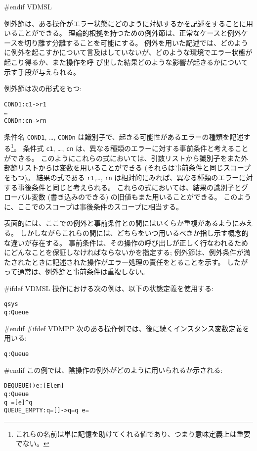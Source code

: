 \documentclass[\pformat,12pt]{jarticle}
\begin{document}
\begin{description}
#endif VDMSL

例外節は、ある操作がエラー状態にどのように対処するかを記述をすることに用いることができる。
理論的根拠を持つための例外節は、正常なケースと例外ケースを切り離す分離することを可能にする。
例外を用いた記述では、どのように例外を起こすかについて言及はしていないが、どのような環境でエラー状態が起こり得るか、また操作を呼
び出した結果どのような影響が起きるかについて示す手段が与えられる。

例外節は次の形式をもつ:
\begin{alltt}
    COND1: c1 -> r1
       \ldots
       CONDn: cn -> rn
\end{alltt}
条件名 {\tt COND1}, \ldots, {\tt CONDn} は識別子で、起きる可能性があるエラーの種類を記述する\footnote{これらの名前は単に記憶を助けてくれる値であり、つまり意味定義上は重要でない。}。 
条件式 {\tt c1}, \ldots, {\tt cn} は、異なる種類のエラーに対する事前条件と考えることができる。
このようにこれらの式においては、引数リストから識別子をまた外部節リストからは変数を用いることができる (それらは事前条件と同じスコープをもつ)。
結果の式である {\tt r1},\ldots, {\tt rn} は相対的にみれば、異なる種類のエラーに対する事後条件と同じと考えられる。
これらの式においては、結果の識別子とグローバル変数 (書き込みのできる) の旧値もまた用いることができる。
このように、ここでのスコープは事後条件のスコープに相当する。

表面的には、ここでの例外と事前条件との間にはいくらか重複があるようにみえる。
しかしながらこれらの間には、どちらをいつ用いるべきか指し示す概念的な違いが存在する。 
事前条件は、その操作の呼び出しが正しく行なわれるためにどんなことを保証しなければならないかを指定する; 例外節は、例外条件が満たされたときに記述された操作がエラー処理の責任をとることを示す。
したがって通常は、例外節と事前条件は重複しない。

#ifdef VDMSL
操作における次の例は、以下の状態定義を使用する:
\begin{alltt}
   qsys 
    q : Queue
\end{alltt}    
#endif
#ifdef VDMPP
次のある操作例では、後に続くインスタンス変数定義を用いる:
\begin{alltt}
    q : Queue
\end{alltt}    
#endif
この例では、陰操作の例外がどのように用いられるか示される:
\begin{alltt}
  DEQUEUE() e: [Elem]
    q : Queue
   q~ = [e] ^ q
   QUEUE_EMPTY: q = [] -> q = q~  e = 
\end{alltt}


\end{description}
\end{document}
